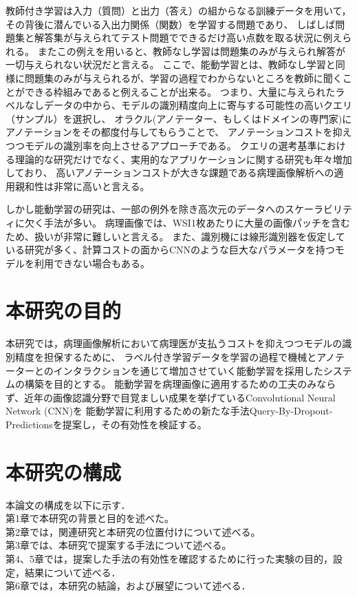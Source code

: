 教師付き学習は入力（質問）と出力（答え）の組からなる訓練データを用いて， その背後に潜んでいる入出力関係（関数）を学習する問題であり、
しばしば問題集と解答集が与えられてテスト問題でできるだけ高い点数を取る状況に例えられる。
またこの例えを用いると、教師なし学習は問題集のみが与えられ解答が一切与えられない状況だと言える。
ここで、能動学習とは、教師なし学習と同様に問題集のみが与えられるが、学習の過程でわからないところを教師に聞くことができる枠組みであると例えることが出来る。
つまり、大量に与えられたラベルなしデータの中から、モデルの識別精度向上に寄与する可能性の高いクエリ（サンプル）を選択し、
オラクル(アノテーター、もしくはドメインの専門家)にアノテーションをその都度付与してもらうことで、
アノテーションコストを抑えつつモデルの識別率を向上させるアプローチである。
クエリの選考基準における理論的な研究だけでなく、実用的なアプリケーションに関する研究も年々増加しており、
高いアノテーションコストが大きな課題である病理画像解析への適用親和性は非常に高いと言える。

しかし能動学習の研究は、一部の例外を除き高次元のデータへのスケーラビリティに欠く手法が多い。
病理画像では、WSI1枚あたりに大量の画像パッチを含むため、扱いが非常に難しいと言える。
また、識別機には線形識別器を仮定している研究が多く、計算コストの面からCNNのような巨大なパラメータを持つモデルを利用できない場合もある。

\section{本研究の目的}
本研究では，病理画像解析において病理医が支払うコストを抑えつつモデルの識別精度を担保するために、
ラベル付き学習データを学習の過程で機械とアノテーターとのインタラクションを通じて増加させていく能動学習を採用したシステムの構築を目的とする。
能動学習を病理画像に適用するための工夫のみならず、近年の画像認識分野で目覚ましい成果を挙げているConvolutional Neural Network (CNN)を
能動学習に利用するための新たな手法Query-By-Dropout-Predictionsを提案し，その有効性を検証する。


\section{本研究の構成}
本論文の構成を以下に示す．\\
第1章で本研究の背景と目的を述べた。 \\
第2章では，関連研究と本研究の位置付けについて述べる。\\
第3章では、本研究で提案する手法について述べる。\\
第4、5章では，提案した手法の有効性を確認するために行った実験の目的，設定，結果について述べる．\\
第6章では，本研究の結論，および展望について述べる．


